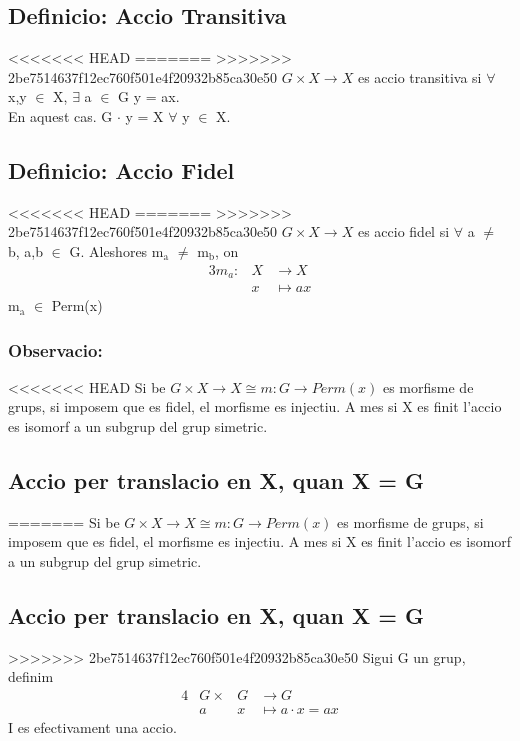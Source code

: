 \documentclass[11pt]{article}
\begin{document}
\subsection{Definicio: Accio Transitiva}
<<<<<<< HEAD
\label{sec:org7c9e6ee}
=======
\label{sec:orgcfb0270}
>>>>>>> 2be7514637f12ec760f501e4f20932b85ca30e50
\(G \times X \to X\) es accio transitiva si \(\forall\) x,y \(\in\) X, \(\exists\) a \(\in\) G  y = ax. \\
En aquest cas. G \(\cdot\) y = X \(\forall\) \quad y \(\in\) X.

\subsection{Definicio: Accio Fidel}
<<<<<<< HEAD
\label{sec:orgf8941a0}
=======
\label{sec:orgbcfc064}
>>>>>>> 2be7514637f12ec760f501e4f20932b85ca30e50
\(G \times X \to X\) es accio fidel si \(\forall\) a \(\neq\) b, a,b \(\in\) G. Aleshores m\(_{\text{a}}\) \(\neq\) m\(_{\text{b}}\), on
\begin{alignat*}{3}
m_a: &X &\to X \\
&x &\mapsto ax
\end{alignat*}
m\(_{\text{a}}\) \(\in\) Perm(x)

\subsubsection{Observacio:}
<<<<<<< HEAD
\label{sec:org82a5f0f}
Si be \(G \times X \to X \cong m: G \to Perm(x)\) es morfisme de grups, si imposem que es fidel, el morfisme es injectiu. A mes si X es finit l'accio es isomorf a un subgrup del grup simetric.

\subsection{Accio per translacio en X, quan X = G}
\label{sec:orga9fd515}
=======
\label{sec:org7d83789}
Si be \(G \times X \to X \cong m: G \to Perm(x)\) es morfisme de grups, si imposem que es fidel, el morfisme es injectiu. A mes si X es finit l'accio es isomorf a un subgrup del grup simetric.

\subsection{Accio per translacio en X, quan X = G}
\label{sec:org618a203}
>>>>>>> 2be7514637f12ec760f501e4f20932b85ca30e50
Sigui G un grup, definim
\begin{alignat*}{4}
&G \times &G &\to G \\
&a &x &\mapsto a \cdot x = ax
\end{alignat*}
I es efectivament una accio.
\end{document}

